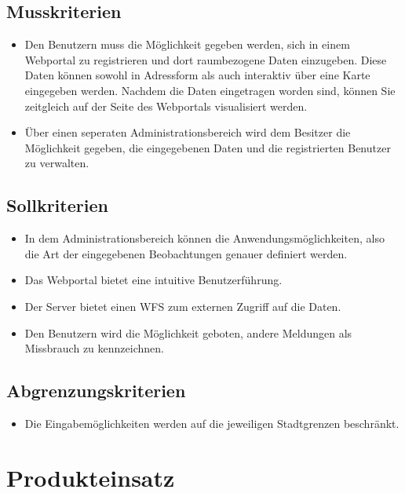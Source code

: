 \documentclass[a4paper,11pt]{scrartcl}
\begin{document}
	\subsection{Musskriterien}
		\begin{itemize}
			\item Den Benutzern muss die Möglichkeit gegeben werden, sich in einem Webportal zu registrieren und dort raumbezogene Daten einzugeben. Diese Daten können sowohl in Adressform als auch interaktiv über eine Karte eingegeben werden. Nachdem die Daten eingetragen worden sind, können Sie zeitgleich auf der Seite des Webportals visualisiert werden.
	            \item Über einen seperaten Administrationsbereich wird dem Besitzer die Möglichkeit gegeben, die eingegebenen Daten und die registrierten Benutzer zu verwalten. 
		\end{itemize}
	\subsection{Sollkriterien}
		\begin{itemize}
			\item In dem Administrationsbereich können die Anwendungsmöglichkeiten, also die Art der eingegebenen 
                    Beobachtungen genauer definiert werden.
			\item Das Webportal bietet eine intuitive Benutzerführung.
			\item Der Server bietet einen WFS zum externen Zugriff auf die Daten.
			\item Den Benutzern wird die Möglichkeit geboten, andere Meldungen als Missbrauch zu kennzeichnen.
		\end{itemize}
	\subsection{Abgrenzungskriterien}
		\begin{itemize}
			\item Die Eingabemöglichkeiten werden auf die jeweiligen Stadtgrenzen beschränkt.
		\end{itemize}
\section{Produkteinsatz}
\end{document}
